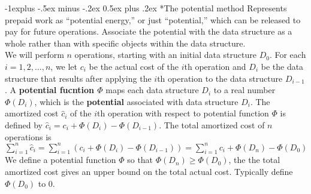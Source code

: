 \documentclass[10pt,landscape]{article}
\makeatletter
\renewcommand{\subsection}{\@startsection{subsection}{2}{0mm}%
                                {-1explus -.5ex minus -.2ex}%
                                {0.5ex plus .2ex}%
                                {\normalfont\normalsize\bfseries}}
\makeatother
\begin{document}
\begin{multicols}{3}
\subsection*{The potential method}
\scriptsize{
Represents prepaid work as ``potential energy,'' or just ``potential,'' which can be released to pay for future operations. Associate the potential with the data structure as a whole rather than with specific objects within the data structure.\\
We will perform $n$ operations, starting with an initial data structure $D_0$. For each $i = 1, 2, \ldots, n$, we let $c_i$ be the actual cost of the $i$th operation and $D_i$ be the data structure that results after applying the $i$th operation to the data structure $D_{i-1}$. A \textbf{potential fucntion $\Phi$} maps each data structure $D_i$ to a real number $\Phi(D_i)$, which is the \textbf{potential} associated with data structure $D_i$. The amortized cost $\hat{c}_i$ of the $i$th operation with respect to potential function $\Phi$ is defined by $\hat{c}_i = c_i + \Phi(D_i) - \Phi(D_{i-1})$. The total amortized cost of $n$ operations is $\sum_{i=1}^{n}\hat{c}_i = \sum_{i=1}^{n}(c_i + \Phi(D_i) - \Phi(D_{i-1})) = \sum_{i=1}^{n}c_i + \Phi(D_n) - \Phi(D_0)$\\
We define a potential function $\Phi$ so that $\Phi(D_n) \geq \Phi(D_0)$, the the total amortized cost gives an upper bound on the total actual cost. Typically define $\Phi(D_0)$ to 0.
}


\end{multicols}
\end{document}
